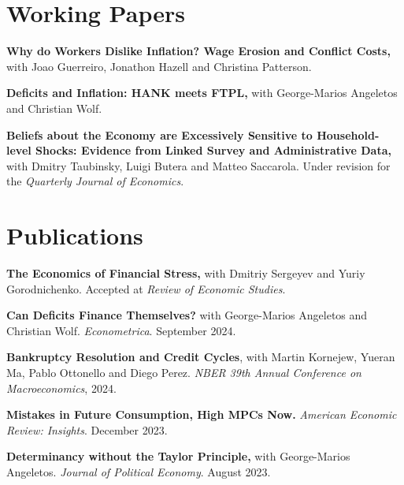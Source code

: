 \documentclass[line]{res}
\newenvironment{list1}{
  \begin{list}{\ding{113}}{%
      \setlength{\itemsep}{0.07in}
      \setlength{\parsep}{0in} \setlength{\parskip}{0in}
		\setlength{\topsep}{0.07in} \setlength{\partopsep}{0in} 
      \setlength{\leftmargin}{0.0in}}}{\end{list}}
\begin{document}
\begin{resume}
\section{\sc Working Papers} 
 \begin{list1}
\item[] \textbf{Why do Workers Dislike Inflation? Wage Erosion and Conflict Costs,} with Joao Guerreiro, Jonathon Hazell and Christina Patterson.
\vspace{0.2cm}
\item[] \textbf{Deficits and Inflation: HANK meets FTPL,} with George-Marios Angeletos and Christian Wolf.  
\vspace{0.2cm} 
\item[] \textbf{Beliefs about the Economy are Excessively Sensitive to Household-level Shocks: Evidence from Linked Survey and Administrative Data,} with Dmitry Taubinsky, Luigi Butera and Matteo Saccarola. Under revision for the \emph{Quarterly Journal of Economics}.
\end{list1}

\section{Publications}

\begin{list1}

\item[] \textbf{The Economics of Financial Stress,} with Dmitriy Sergeyev and Yuriy Gorodnichenko. Accepted at \emph{Review of Economic Studies}. 
\vspace{0.2cm}

\item[] \textbf{Can Deficits Finance Themselves?} with George-Marios Angeletos and Christian Wolf. \emph{Econometrica}. September 2024. 
\vspace{0.2cm}

\item[] \textbf{Bankruptcy Resolution and Credit Cycles}, with Martin Kornejew, Yueran Ma, Pablo Ottonello and Diego Perez. \emph{NBER 39th Annual Conference on Macroeconomics}, 2024.
\vspace{0.2cm}

\item[] \textbf{Mistakes in Future Consumption, High MPCs Now.} \emph{American Economic Review: Insights}. December 2023.  
\vspace{0.2cm}

\item[] \textbf{Determinancy without the Taylor Principle,} with George-Marios Angeletos. \emph{Journal of Political Economy}. August 2023.


\end{list1}
\end{resume}
\end{document}
